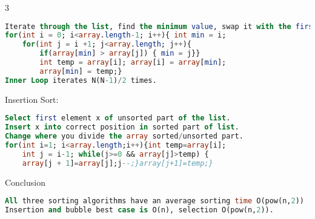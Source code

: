 \documentclass[10pt,landscape]{article}
\begin{document}
\begin{multicols}{3}
\begin{lstlisting}[language=SQL]
Iterate through the list, find the minimum value, swap it with the first element of the unsorted list, start again, but one index further in the list 
for(int i = 0; i<array.length-1; i++){ int min = i;
    for(int j = i +1; j<array.length; j++){
        if(array[min] > array[j]) { min = j}}
        int temp = array[i]; array[i] = array[min];
        array[min] = temp;}
Inner Loop iterates N(N-1)/2 times. 
\end{lstlisting}
Insertion Sort:
\begin{lstlisting}[language=SQL]
Select first element x of unsorted part of the list. 
Insert x into correct position in sorted part of list.
Change where you divide the array sorted/unsorted part. 
for(int i=1; i<array.length;i++){int temp=array[i];
	int j = i-1; while(j>=0 && array[j]>temp) {
	array[j + 1]=array[j];j--;}array[j+1]=temp;}
\end{lstlisting}
Conclusion
\begin{lstlisting}[language=SQL]
All three sorting algorithms have an average sorting time O(pow(n,2)) 
Insertion and bubble best case is O(n), selection O(pow(n,2)). 
\end{lstlisting}
\end{multicols}
\end{document}
